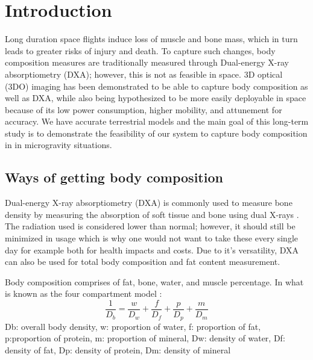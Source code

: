 

\chapter{Introduction}

Long duration space flights induce loss of muscle and bone mass, which in turn leads to greater risks of injury and death. To capture such changes, body composition measures are traditionally measured through Dual-energy X-ray absorptiometry (DXA); however, this is not as feasible in space. 3D optical (3DO) imaging has been demonstrated to be able to capture body composition as well as DXA, while also being hypothesized to be more easily deployable in space because of its low power consumption, higher mobility, and attunement for accuracy. We have accurate terrestrial models and the main goal of this long-term study is to demonstrate the feasibility of our system to capture body composition in in microgravity situations. 
\section{Ways of getting body composition}
Dual-energy X-ray absorptiometry (DXA) is commonly used to measure bone density by measuring the absorption of soft tissue and bone using dual X-rays \cite{albanese2003clinical}. The radiation used is considered lower than normal; however, it should still be minimized in usage which is why one would not want to take these every single day for example both for health impacts and costs. Due to it's versatility, DXA can also be used for total body composition and fat content measurement.

Body composition comprises of fat, bone, water, and muscle percentage. In what is known as the four compartment model \cite{fuller1992four}:
\begin{equation}
	\frac{1}{D_b} = \frac{w}{D_w} + \frac{f}{D_f} + \frac{p}{D_p} + \frac{m}{D_m}
\end{equation}
Db: overall body density, w: proportion of water, f: proportion of fat, p:proportion of protein, m: proportion of mineral, Dw: density of water, Df: density of fat, Dp: density of protein, Dm: density of mineral

